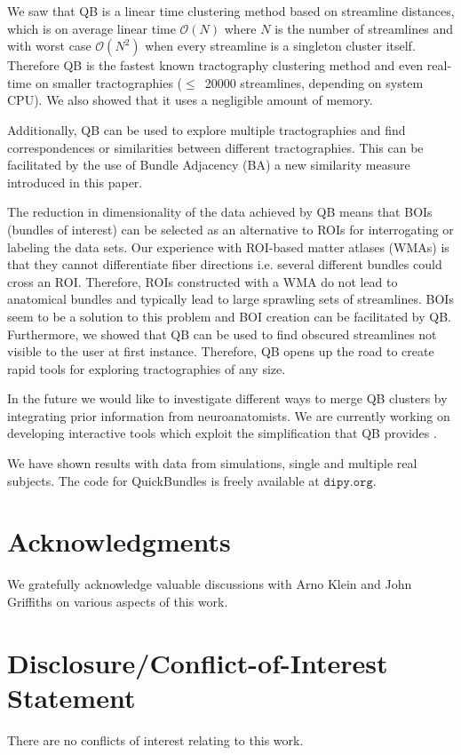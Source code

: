 \documentclass{bioinfo}
\begin{document}
We saw that QB is a linear time clustering method based on streamline
distances, which is on average linear time $\mathcal{O}(N)$ where $N$ is
the number of streamlines and with worst case $\mathcal{O}(N^{2})$ when
every streamline is a singleton cluster itself. Therefore QB is the
fastest known tractography clustering method and even real-time on
smaller tractographies ($\le$~\num{20000} streamlines, depending on
system CPU). We also showed that it uses a negligible amount of memory.

Additionally, QB can be used to explore multiple tractographies and find
correspondences or similarities between different tractographies. This
can be facilitated by the use of Bundle Adjacency (BA) a new similarity
measure introduced in this paper.

The reduction in dimensionality of the data achieved by QB means that
BOIs (bundles of interest) can be selected as an alternative to ROIs for
interrogating or labeling the data sets.  Our experience with ROI-based
matter atlases (WMAs) is that they cannot differentiate fiber directions
i.e. several different bundles could cross an ROI. Therefore, ROIs
constructed with a WMA do not lead to anatomical bundles and typically
lead to large sprawling sets of streamlines. BOIs seem to be a solution
to this problem and BOI creation can be facilitated by QB. Furthermore,
we showed that QB can be used to find obscured streamlines not visible
to the user at first instance. Therefore, QB opens up the road to create
rapid tools for exploring tractographies of any size.

In the future we would like to investigate different ways to merge QB
clusters by integrating prior information from neuroanatomists. We are
currently working on developing interactive tools which exploit the
simplification that QB provides \citep[see][]{GaryfallidisHBM2012}.

We have shown results with data from simulations, single and multiple
real subjects. The code for QuickBundles is freely available at
$\texttt{dipy.org}$.

\section*{Acknowledgments}
We gratefully acknowledge valuable discussions with Arno Klein and John
Griffiths on various aspects of this work.

\section*{Disclosure/Conflict-of-Interest Statement}
There are no conflicts of interest relating to this work.

%

%
%
%
%

\end{document}
